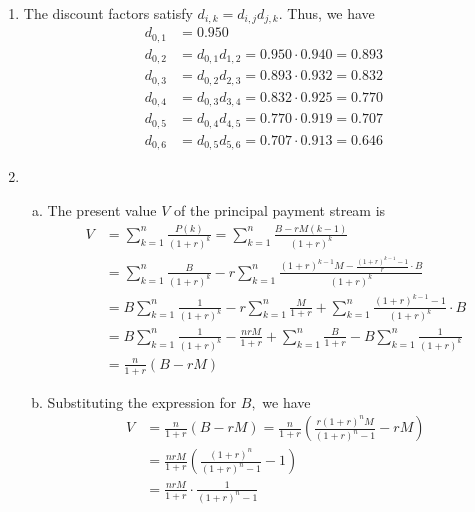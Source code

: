 \documentclass{article}
\begin{document}
\begin{enumerate}[1.]
	\item
		\begin{soln}
			The discount factors satisfy $d_{i, k}=d_{i, j}d_{j, k}.$ Thus, we have
			\begin{align*}
				d_{0, 1} &= 0.950 \\
				d_{0, 2} &= d_{0, 1}d_{1, 2} = 0.950\cdot 0.940 = 0.893 \\
				d_{0, 3} &= d_{0, 2} d_{2, 3} = 0.893\cdot 0.932 = 0.832 \\
				d_{0, 4} &= d_{0, 3}d_{3, 4} = 0.832\cdot 0.925 = 0.770 \\
				d_{0, 5} &= d_{0, 4}d_{4, 5} = 0.770\cdot 0.919 = 0.707 \\
				d_{0, 6} &= d_{0, 5}d_{5, 6} = 0.707\cdot 0.913 = 0.646
			\end{align*}
		\end{soln}

	\item 
		\begin{enumerate}[(a)]
			\item
				\begin{soln}
					The present value $V$ of the principal payment stream is
					\begin{align*}
						V &= \sum_{k=1}^{n} \frac{P(k)}{(1+r)^k} = \sum_{k=1}^{n} \frac{B-rM(k-1)}{(1+r)^k} \\
						&= \sum_{k=1}^{n} \frac{B}{(1+r)^k} - r\sum_{k=1}^{n} \frac{(1+r)^{k-1} M - \frac{(1+r)^{k-1}-1}{r}\cdot B}{(1+r)^k} \\
						&= B\sum_{k=1}^{n} \frac{1}{(1+r)^k} - r\sum_{k=1}^{n} \frac{M}{1+r} + \sum_{k=1}^{n} \frac{(1+r)^{k-1}-1}{(1+r)^k}\cdot B \\
						&= B\sum_{k=1}^{n} \frac{1}{(1+r)^k} - \frac{nrM}{1+r} + \sum_{k=1}^{n} \frac{B}{1+r} - B\sum_{k=1}^{n} \frac{1}{(1+r)^k} \\
						&= \boxed{\frac{n}{1+r}\left( B-rM \right)}
					\end{align*}
				\end{soln}

			\item 
				\begin{soln}
					Substituting the expression for $B,$ we have
					\begin{align*}
						V &= \frac{n}{1+r}(B-rM) = \frac{n}{1+r}\left( \frac{r(1+r)^nM}{(1+r)^n-1} - rM\right) \\
						&= \frac{nrM}{1+r}\left( \frac{(1+r)^n}{(1+r)^n-1}-1 \right) \\
						&= \boxed{\frac{nrM}{1+r}\cdot \frac{1}{(1+r)^n-1}}
					\end{align*}
				\end{soln}


\end{enumerate}
\end{enumerate}
\end{document}
